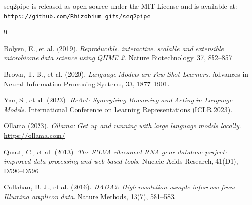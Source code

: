 \documentclass[12pt, a4paper]{article}
\begin{document}
seq2pipe is released as open source under the MIT License and is available at:
\texttt{https://github.com/Rhizobium-gits/seq2pipe}

\begin{thebibliography}{9}

  Bolyen, E., et al. (2019).
  \textit{Reproducible, interactive, scalable and extensible microbiome
    data science using QIIME 2}.
  Nature Biotechnology, 37, 852--857.

  Brown, T. B., et al. (2020).
  \textit{Language Models are Few-Shot Learners}.
  Advances in Neural Information Processing Systems, 33, 1877--1901.

  Yao, S., et al. (2023).
  \textit{ReAct: Synergizing Reasoning and Acting in Language Models}.
  International Conference on Learning Representations (ICLR 2023).

  Ollama (2023).
  \textit{Ollama: Get up and running with large language models locally}.
  \url{https://ollama.com/}

  Quast, C., et al. (2013).
  \textit{The SILVA ribosomal RNA gene database project:
    improved data processing and web-based tools}.
  Nucleic Acids Research, 41(D1), D590--D596.

  Callahan, B. J., et al. (2016).
  \textit{DADA2: High-resolution sample inference from Illumina amplicon data}.
  Nature Methods, 13(7), 581--583.

\end{thebibliography}
\end{document}
